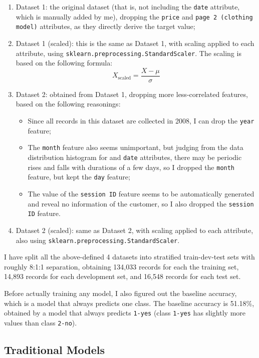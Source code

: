 \documentclass[12pt,twoside,a4paper]{article}
\begin{document}
\begin{enumerate}
    \item Dataset 1: the original dataset (that is, not including the \texttt{date} attribute, which is manually added by me), dropping the \texttt{price} and \texttt{page 2 (clothing model)} attributes, as they directly derive the target value;
    \item Dataset 1 (scaled): this is the same as Dataset 1, with scaling applied to each attribute, using \texttt{sklearn.preprocessing.StandardScaler}. The scaling is based on the following formula:
        $$X_{\text{scaled}} = \frac{X-\mu}{\sigma}$$
    \item Dataset 2: obtained from Dataset 1, dropping more less-correlated features, based on the following reasonings:
        \begin{itemize}
            \item Since all records in this dataset are collected in 2008, I can drop the \texttt{year} feature;
            \item The \texttt{month} feature also seems unimportant, but judging from the data distribution histogram for  and \texttt{date} attributes, there may be periodic rises and falls with durations of a few days, so I dropped the \texttt{month} feature, but kept the \texttt{day} feature;
            \item The value of the \texttt{session ID} feature seems to be automatically generated and reveal no information of the customer, so I also dropped the \texttt{session ID} feature.
        \end{itemize}
    \item Dataset 2 (scaled): same as Dataset 2, with scaling applied to each attribute, also using \texttt{sklearn.preprocessing.StandardScaler}.
\end{enumerate}

I have split all the above-defined 4 datasets into stratified train-dev-test sets with roughly 8:1:1 separation, obtaining 134,033 records for each the training set, 14,893 records for each development set, and 16,548 records for each test set.

Before actually training any model, I also figured out the baseline accuracy, which is a model that always predicts one class. The baseline accuracy is 51.18\%, obtained by a model that always predicts \texttt{1-yes} (class \texttt{1-yes} has slightly more values than class \texttt{2-no}).

\subsection{Traditional Models}
\end{document}
